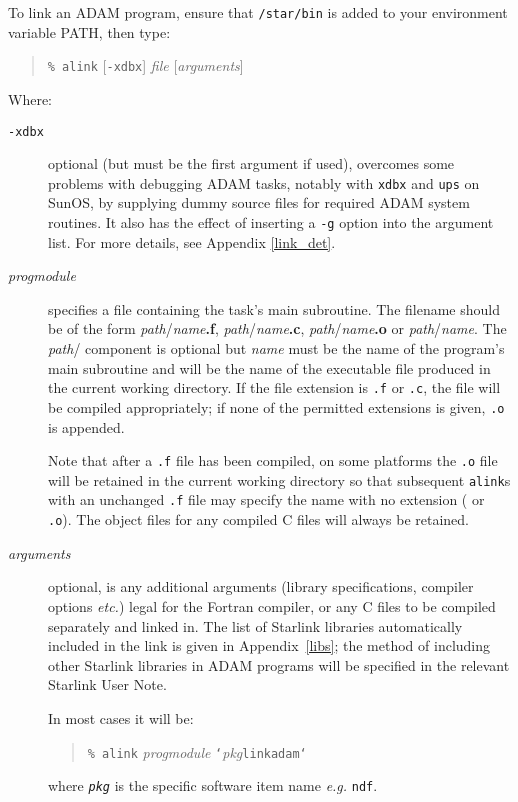 \documentclass[twoside,11pt]{article}
\renewcommand{\_}{\texttt{\symbol{95}}}
\begin{document}
To link an ADAM program, ensure that \texttt{/star/bin} is added to your 
environment variable PATH, then type:
\begin{quote} 
\texttt{\% alink} [{\texttt{-xdbx}}] {\textit{file}} [{\textit{arguments}}]
\end{quote}
Where:
\begin{description}
\item[{\texttt{-xdbx}}] optional (but must be the first argument if used), 
overcomes some problems with debugging ADAM tasks, notably with \texttt{xdbx} 
and \texttt{ups} on SunOS, by supplying dummy source files for required ADAM 
system routines. It also has the effect of inserting a \texttt{-g} option into 
the argument list. For more details, see Appendix \ref{link_det}.
\item[\textit{prog\_module}] specifies a file containing the task's main
subroutine. The filename should be of the form 
{\textit{path}/\textit{name}\bf{.f}}, {\textit{path}/\textit{name}\bf{.c}}, 
{\textit{path}/\textit{name}\bf{.o}} or  {\textit{path}/\textit{name}}. 
The \textit{path}/ component is optional but
\textit{name} must be the name of the program's main subroutine and will
be the name of the executable file produced in the current working directory.
If the file extension is \texttt{.f} or \texttt{.c}, the file will be compiled
appropriately; if none of the permitted extensions is given,
\texttt{.o} is appended.

Note that after a \texttt{.f} file has been compiled, on some platforms the 
\texttt{.o} file will be retained in the current working directory so that 
subsequent \texttt{alink}s with an unchanged \texttt{.f} file may specify the 
name with no extension ( or \texttt{.o}).
The object files for any compiled C files will always be retained.
\item[\textit{arguments}] optional, is any additional arguments (library 
specifications, compiler options \textit{etc.}) legal for the Fortran 
compiler, or any C files to be compiled separately and linked in.
The list of Starlink libraries automatically included in the link is given in 
Appendix~\ref{libs}; the method of including other Starlink libraries in ADAM
programs will be specified in the relevant Starlink User Note.

In most cases it will be:
\begin{quote}
\texttt{\% alink} {\textit{prog\_module} \texttt{`}\textit{pkg}\texttt{\_link\_adam`}}
\end{quote}
where \texttt{\textit{pkg}} is the specific software item name \textit{e.g.} 
\texttt{ndf}.
\end{description}
\end{document}
